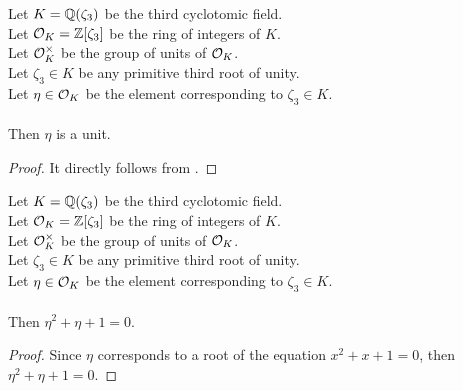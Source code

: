 \begin{lemma}
    \label{lmm:eta_isUnit}
    \leanok
    Let $K = \mathbb{Q}(\zeta_3)$ be the third cyclotomic field. \\
    Let $\mathcal{O}_K = \mathbb{Z}[\zeta_3]$ be the ring of integers of $K$. \\
    Let $\mathcal{O}^\times_K$ be the group of units of $\mathcal{O}_K$. \\
    Let $\zeta_3 \in K$ be any primitive third root of unity. \\
    Let $\eta \in \mathcal{O}_K$ be the element corresponding to $\zeta_3 \in K$. \\\\
    Then $\eta$ is a unit.
\end{lemma}
\begin{proof}
    \leanok
    It directly follows from .
\end{proof}

\begin{lemma}
    \label{lmm:toInteger_eval_cyclo}
    \leanok
    Let $K = \mathbb{Q}(\zeta_3)$ be the third cyclotomic field. \\
    Let $\mathcal{O}_K = \mathbb{Z}[\zeta_3]$ be the ring of integers of $K$. \\
    Let $\mathcal{O}^\times_K$ be the group of units of $\mathcal{O}_K$. \\
    Let $\zeta_3 \in K$ be any primitive third root of unity. \\
    Let $\eta \in \mathcal{O}_K$ be the element corresponding to $\zeta_3 \in K$. \\\\
    Then $\eta^2 + \eta + 1 = 0$.
\end{lemma}
\begin{proof}
    \leanok
    Since $\eta$ corresponds to a root of the equation $x^2 + x + 1 = 0$,
    then $\eta^2 + \eta + 1 = 0$.
\end{proof}

